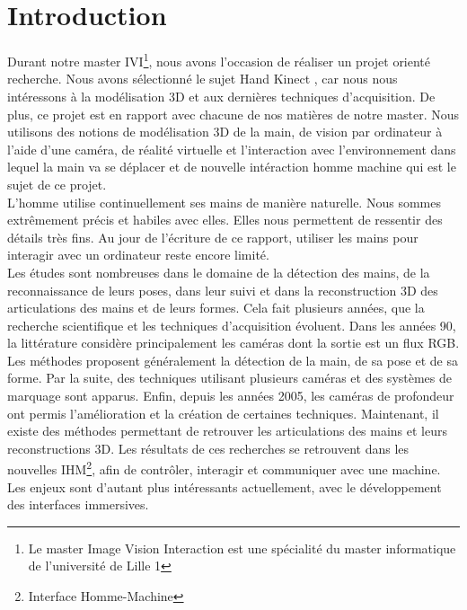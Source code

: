 \chapter*{Introduction}

Durant notre master IVI\footnote{Le master Image Vision Interaction est 
une spécialité du master informatique de l'université de Lille 1}, 
nous avons l'occasion de réaliser un projet orienté recherche. Nous avons 
sélectionné le sujet \og Hand Kinect \fg, car nous nous intéressons à la 
modélisation 3D et aux dernières techniques d'acquisition.
De plus, ce projet est en rapport avec chacune de nos matières de
notre master. Nous utilisons des notions de modélisation 3D de la main, de vision par ordinateur à l'aide d'une caméra, de réalité virtuelle et l'interaction avec l'environnement dans lequel la main va se déplacer et de nouvelle intéraction
homme machine qui est le sujet de ce projet.\\

L'homme utilise continuellement ses mains de manière naturelle. Nous 
sommes extrêmement précis et habiles avec elles. Elles nous permettent 
de ressentir des détails très fins. Au jour de l'écriture de ce rapport, 
utiliser les mains pour interagir avec un ordinateur reste encore limité.\\

Les études sont nombreuses dans le domaine de la détection des mains, 
de la reconnaissance de leurs poses, dans leur suivi et dans la reconstruction 
3D des articulations des mains et de leurs formes. Cela fait plusieurs 
années, que la recherche scientifique et les techniques d'acquisition 
évoluent. Dans les années 90, la littérature considère principalement les 
caméras dont la sortie est un flux RGB. Les méthodes proposent généralement la 
détection de la main, de sa pose et de sa forme. Par la suite, des techniques 
utilisant plusieurs caméras et des systèmes de marquage sont apparus. 
Enfin, depuis les années 2005, les caméras de profondeur ont permis 
l'amélioration et la création de certaines techniques. Maintenant, il 
existe des méthodes permettant de retrouver les articulations des mains 
et leurs reconstructions 3D. Les résultats de ces recherches se 
retrouvent dans les nouvelles IHM\footnote{Interface Homme-Machine}, 
afin de contrôler, interagir et communiquer avec une machine. Les enjeux 
sont d'autant plus intéressants actuellement, avec le développement des 
interfaces immersives.\\

